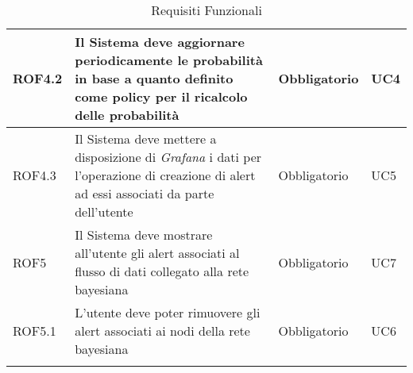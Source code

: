 \begin{center}
\begin{longtable}[c]{|m{}|m{}|m{}|m{}|}
\hline
\rowcolor{grigio}ROF4.2 & Il Sistema deve aggiornare periodicamente le probabilità in base a quanto definito come policy per il ricalcolo delle probabilità & Obbligatorio & UC4\\
\hline
ROF4.3 & Il Sistema deve mettere a disposizione di \textit{Grafana} i dati per l'operazione di creazione di alert ad essi associati da parte dell'utente & Obbligatorio & UC5\\
\hline
\rowcolor{grigio}ROF5 & Il Sistema deve mostrare all'utente gli alert associati al flusso di dati collegato alla rete bayesiana & Obbligatorio & UC7\\ 
\hline
ROF5.1 & L'utente deve poter rimuovere gli alert associati ai nodi della rete bayesiana & Obbligatorio & UC6\\ 
\hline
\caption{Requisiti Funzionali}
\end{longtable}
\end{center}



